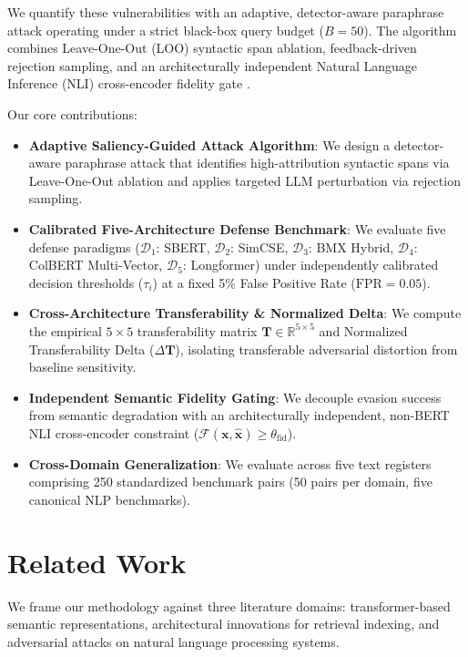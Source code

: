 \documentclass[conference,onecolumn,11pt]{IEEEtran}
\begin{document}
We quantify these vulnerabilities with an adaptive, detector-aware paraphrase attack operating under a strict black-box query budget ($B = 50$). The algorithm combines Leave-One-Out (LOO) syntactic span ablation, feedback-driven rejection sampling, and an architecturally independent Natural Language Inference (NLI) cross-encoder fidelity gate \cite{he2021deberta, zhang2019bertscore}.

Our core contributions:
\begin{itemize}
    \item \textbf{Adaptive Saliency-Guided Attack Algorithm}: We design a detector-aware paraphrase attack that identifies high-attribution syntactic spans via Leave-One-Out ablation and applies targeted LLM perturbation via rejection sampling.
    \item \textbf{Calibrated Five-Architecture Defense Benchmark}: We evaluate five defense paradigms ($\mathcal{D}_1$: SBERT, $\mathcal{D}_2$: SimCSE, $\mathcal{D}_3$: BMX Hybrid, $\mathcal{D}_4$: ColBERT Multi-Vector, $\mathcal{D}_5$: Longformer) under independently calibrated decision thresholds ($\tau_i$) at a fixed 5\% False Positive Rate ($\text{FPR} = 0.05$).
    \item \textbf{Cross-Architecture Transferability \& Normalized Delta}: We compute the empirical $5 \times 5$ transferability matrix $\mathbf{T} \in \mathbb{R}^{5 \times 5}$ and Normalized Transferability Delta ($\Delta\mathbf{T}$), isolating transferable adversarial distortion from baseline sensitivity.
    \item \textbf{Independent Semantic Fidelity Gating}: We decouple evasion success from semantic degradation with an architecturally independent, non-BERT NLI cross-encoder constraint ($\mathcal{F}(\mathbf{x}, \mathbf{\hat{x}}) \ge \theta_{\text{fid}}$).
    \item \textbf{Cross-Domain Generalization}: We evaluate across five text registers comprising 250 standardized benchmark pairs (50 pairs per domain, five canonical NLP benchmarks).
\end{itemize}

\section{Related Work}

We frame our methodology against three literature domains: transformer-based semantic representations, architectural innovations for retrieval indexing, and adversarial attacks on natural language processing systems.
\end{document}
